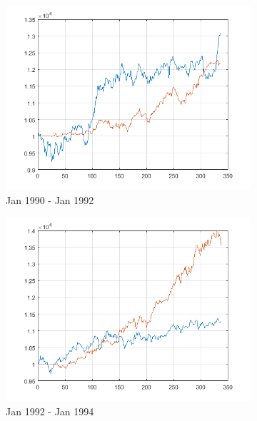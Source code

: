 \documentclass[11pt,a4,twosided,singlespacing,titlepagenumber=on]{scrreprt}
\numberwithin{equation}{chapter} %
\theoremstyle{remark}
\begin{document}
\begin{figure}[H]
    \centering
    \begin{subfigure}[t]{0.32\textwidth}
        \centering
        \includegraphics[width=1\textwidth]{res/backtest_cpx/1}
        \caption{Jan 1990 - Jan 1992}
    \end{subfigure}
    \begin{subfigure}[t]{0.32\textwidth}
        \centering
        \includegraphics[width=1\textwidth]{res/backtest_cpx/2}
        \caption{Jan 1992 - Jan 1994}
    \end{subfigure}
    \begin{subfigure}[t]{0.32\textwidth}
        \centering

\end{subfigure}
\end{figure}
\end{document}
